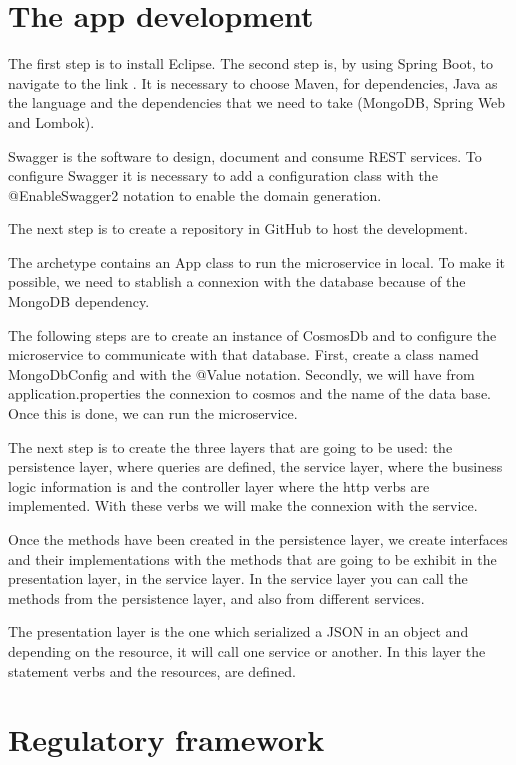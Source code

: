\documentclass[12pt]{report} %
\begin{document}
\section{The app development}

The first step is to install Eclipse. The second step is, by using Spring Boot, to navigate to the link \cite{startSpring}. It is necessary to choose Maven, for dependencies, Java as the language and the dependencies that we need to take (MongoDB, Spring Web and Lombok).

Swagger is the software to design, document and consume REST services. To configure Swagger it is necessary to add a configuration class with the @EnableSwagger2 notation to enable the domain generation.

The next step is to create a repository in GitHub \cite{repositorio} to host the development.

The archetype contains an App class to run the microservice in local. To make it possible, we need to stablish a connexion with the database because of the MongoDB dependency.

The following steps are to create an instance of CosmosDb and to configure the microservice to communicate with that database. First, create a class named MongoDbConfig and with the @Value notation. Secondly, we will have from application.properties the connexion to cosmos and the name of the data base. Once this is done, we can run the microservice.

The next step is to create the three layers that are going to be used: the persistence layer, where queries are defined, the service layer, where the business logic information is and the controller layer where the http verbs are implemented. With these verbs we will make the connexion with the service.

Once the methods have been created in the persistence layer, we create interfaces and their implementations with the methods that are going to be exhibit in the presentation layer, in the service layer.
In the service layer you can call the methods from the persistence layer, and also from different services.

The presentation layer is the one which serialized a JSON in an object and depending on the resource, it will call one service or another. In this layer the statement verbs and the resources, are defined.

\section{Regulatory framework}
\end{document}
